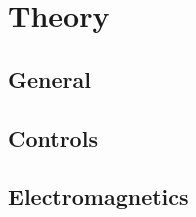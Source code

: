 \chapter{Theory}\label{ch:theory}



\section{General}







\section{Controls}


\section{Electromagnetics}




